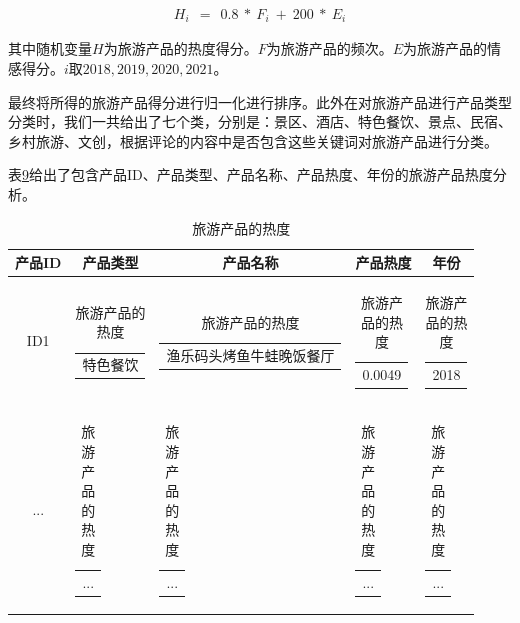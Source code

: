 \documentclass[bwprint]{gmcmthesis}
\begin{document}
  \begin{gather}
	H_i~~=~~0.8~*~F_i ~+ ~200 ~*~ E_i
\end{gather}

其中随机变量$H$为旅游产品的热度得分。$F$为旅游产品的频次。$E$为旅游产品的情感得分。$i$取$2018,2019,2020,2021$。


最终将所得的旅游产品得分进行归一化进行排序。此外在对旅游产品进行产品类型分类时，我们一共给出了七个类，分别是：景区、酒店、特色餐饮、景点、民宿、乡村旅游、文创，根据评论的内容中是否包含这些关键词对旅游产品进行分类。


表\ref{hot_rate}给出了包含产品ID、产品类型、产品名称、产品热度、年份的旅游产品热度分析。

\begin{center}
  \begin{longtable}{c|c|c|c|c}
    \caption{旅游产品的热度}
    \label{hot_rate}\\
      \hline
      \textbf{产品ID} & \textbf{产品类型} & \textbf{产品名称} & \textbf{产品热度}& \textbf{年份}\\
      \hline
      ID1 & \begin{tabular}[c]{@{}c@{}}
        特色餐饮
        \end{tabular} 
        & \begin{tabular}[c]{@{}l@{}}
          渔乐码头烤鱼牛蛙晚饭餐厅
        \end{tabular} 
        & \begin{tabular}[c]{@{}c@{}}
          0.0049
          \end{tabular}
          & \begin{tabular}[c]{@{}c@{}}
            2018
            \end{tabular}\\
        ... & \begin{tabular}[c]{@{}c@{}}
          ...
        \end{tabular} 
        & \begin{tabular}[c]{@{}l@{}}
          ...
        \end{tabular} 
        & \begin{tabular}[c]{@{}c@{}}
          ...
        \end{tabular} 
        & \begin{tabular}[c]{@{}c@{}}
          ...
        \end{tabular} \\


\end{longtable}
\end{center}
\end{document}
